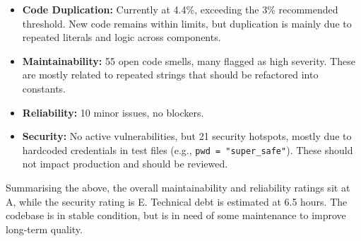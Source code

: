 \begin{itemize}
    \item \textbf{Code Duplication:} Currently at 4.4\%, exceeding the 3\% recommended threshold. New code remains within limits, but duplication is mainly due to repeated literals and logic across components.
    
    \item \textbf{Maintainability:} 55 open code smells, many flagged as high severity. These are mostly related to repeated strings that should be refactored into constants.
    
    \item \textbf{Reliability:} 10 minor issues, no blockers.
    
    \item \textbf{Security:} No active vulnerabilities, but 21 security hotspots, mostly due to hardcoded credentials in test files (e.g., \texttt{pwd = "super\_safe"}). These should not impact production and should be reviewed.
\end{itemize}

Summarising the above, the overall maintainability and reliability ratings sit at A, while the security rating is E. Technical debt is estimated at 6.5 hours. The codebase is in stable condition, but is in need of some maintenance to improve long-term quality.



